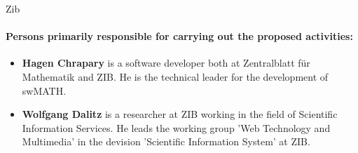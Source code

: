 \begin{sitedescription}{Zib}





\paragraph{Persons primarily responsible for carrying out the proposed activities:}

\begin{itemize} %

\item{\bf Hagen Chrapary} is a  software developer both at Zentralblatt für Mathematik and ZIB. He is the technical leader for the development of swMATH. 
\item{\bf Wolfgang Dalitz} is a  researcher at ZIB working in the field of Scientific Information Services. 
He leads the working group 'Web Technology and Multimedia' in the devision 'Scientific Information System' at ZIB.

\end{itemize}

\end{sitedescription}

